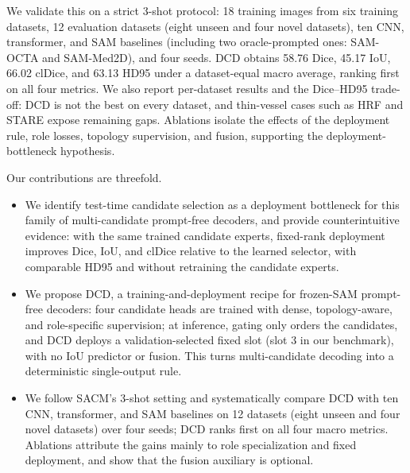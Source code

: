 We validate this on a strict 3-shot protocol: 18 training images from six
training datasets, 12 evaluation datasets (eight unseen and four novel
datasets), ten CNN, transformer, and SAM baselines (including two
oracle-prompted ones: SAM-OCTA and SAM-Med2D), and four seeds. DCD obtains 58.76 Dice,
45.17 IoU, 66.02 clDice, and 63.13 HD95 under a dataset-equal macro average,
ranking first on all four metrics. We also report per-dataset results and the
Dice--HD95 trade-off: DCD is not the best on every dataset, and thin-vessel cases
such as HRF and STARE expose remaining gaps. Ablations isolate the effects of
the deployment rule, role losses, topology supervision, and fusion, supporting
the deployment-bottleneck hypothesis.

Our contributions are threefold.
\begin{itemize}
\item We identify test-time candidate selection as a deployment bottleneck for
this family of multi-candidate prompt-free decoders, and provide
counterintuitive evidence: with the same trained candidate experts, fixed-rank
deployment improves Dice, IoU, and clDice relative to the learned selector,
with comparable HD95 and without retraining the candidate experts.
\item We propose DCD, a training-and-deployment recipe for frozen-SAM
prompt-free decoders: four candidate heads are trained with dense,
topology-aware, and role-specific supervision; at inference, gating only
orders the candidates, and DCD deploys a validation-selected fixed slot
(slot 3 in our benchmark), with no IoU predictor or fusion. This turns
multi-candidate decoding into a deterministic single-output rule.
\item We follow SACM's 3-shot setting and systematically compare DCD with ten
CNN, transformer, and SAM baselines on 12 datasets (eight unseen and
four novel datasets) over four seeds; DCD ranks first on all four macro metrics.
Ablations attribute the gains mainly to role specialization and fixed
deployment, and show that the fusion auxiliary is optional.
\end{itemize}

